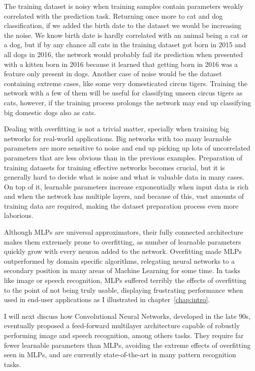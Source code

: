 The training dataset is noisy when training samples contain parameters weakly correlated with the prediction task.
Returning once more to cat and dog classification, if we added the birth date to the dataset we would be increasing the noise.
We know birth date is hardly correlated with an animal being a cat or a dog, but if by any chance all cats in the training dataset got born in 2015 and all dogs in 2016, the network would probably fail its prediction when presented with a kitten born in 2016 because it learned that getting born in 2016 was a feature only present in dogs.
Another case of noise would be the dataset containing extreme cases, like some very domesticated circus tigers.
Training the network with a few of them will be useful for classifying unseen circus tigers as cats, however, if the training process prolongs the network may end up classifying big domestic dogs also as cats.

Dealing with overfitting is not a trivial matter, specially when training big networks for real-world applications.
Big networks with too many learnable parameters are more sensitive to noise and end up picking up lots of uncorrelated parameters that are less obvious than in the previous examples.
Preparation of training datasets for training effective networks becomes crucial, but it is generally hard to decide what is noise and what is valuable data in many cases.
On top of it, learnable parameters increase exponentially when input data is rich and when the network has multiple layers, and because of this, vast amounts of training data are required, making the dataset preparation process even more laborious.

Although MLPs are universal approximators, their fully connected architecture makes them extremely prone to overfitting, as number of learnable parameters quickly grow with every neuron added to the network.
Overfitting made MLPs outperformed by domain specific algorithms, relegating neural networks to a secondary position in many areas of Machine Learning for some time.
In tasks like image or speech recognition, MLPs suffered terribly the effects of overfitting to the point of not being truly usable, displaying frustrating performance when used in end-user applications as I illustrated in chapter~\ref{chap:intro}.

I will next discuss how Convolutional Neural Networks, developed in the late 90s, eventually proposed a feed-forward multilayer architecture capable of robustly performing image and speech recognition, among others tasks.
They require far fewer learnable parameters than MLPs, avoiding the extreme effects of overfitting seen in MLPs, and are currently state-of-the-art in many pattern recognition tasks.


